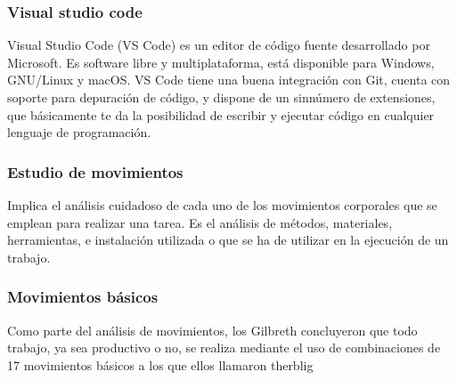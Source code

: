 \cite{Microsoft}

\subsubsection{Visual studio code}

Visual Studio Code (VS Code) es un editor de código fuente desarrollado por Microsoft. Es software libre y multiplataforma, está disponible para Windows, GNU/Linux y macOS. VS Code tiene una buena integración con Git, cuenta con soporte para depuración de código, y dispone de un sinnúmero de extensiones, que básicamente te da la posibilidad de escribir y ejecutar código en cualquier lenguaje de programación.\cite{OpenWebinars.net}

\subsubsection{Estudio de movimientos}

Implica el análisis cuidadoso de cada uno de los movimientos corporales que se emplean para realizar una tarea. 
\cite{niebel1980ingenieria}
Es el análisis de métodos, materiales, herramientas, e instalación utilizada o que se ha de utilizar en la ejecución de un trabajo.

\subsubsection{Movimientos básicos} 
Como parte del análisis de movimientos, los Gilbreth concluyeron que todo trabajo, ya sea productivo o no, se realiza mediante el uso de combinaciones de 17 movimientos básicos a los que ellos llamaron therblig \cite{niebel1980ingenieria}  


